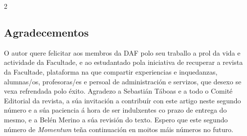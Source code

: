 \begin{refsection}
\begin{multicols}{2}
\subsection*{Agradecementos}

O autor quere felicitar aos membros da DAF polo seu traballo a prol da vida e
actividade da Facultade, e ao estudantado pola iniciativa de recuperar a
revista da Facultade, plataforma na que compartir experiencias e inquedanzas,
alumnas/os, profesoras/es e persoal de administración e servizos, que desexo se
vexa refrendada polo éxito. Agradezo a Sebastián Táboas e a todo o Comité
Editorial da revista, a súa invitación a contribuír con este artigo neste
segundo número e a súa paciencia á hora de ser indulxentes co prazo de entrega
do mesmo, e a Belén Merino a súa revisión do texto. Espero que este segundo
número de \textit{Momentum} teña continuación en moitos máis números no futuro.

\nocite{Merino_2015}

\printbibliography

\end{multicols}
\end{refsection}
